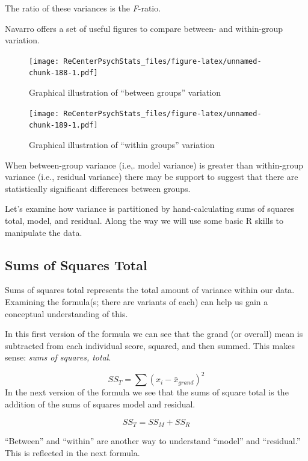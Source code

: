 \documentclass[
  11pt,
]{book}
\begin{document}
The ratio of these variances is the \emph{F}-ratio.

Navarro \citeyearpar{navarro_book_2020} offers a set of useful figures to compare between- and within-group variation.

\begin{figure}
\centering
\texttt{[image: ReCenterPsychStats\_files/figure-latex/unnamed-chunk-188-1.pdf]}
\caption{\label{fig:unnamed-chunk-188}Graphical illustration of ``between groups'' variation}
\end{figure}

\begin{figure}
\centering
\texttt{[image: ReCenterPsychStats\_files/figure-latex/unnamed-chunk-189-1.pdf]}
\caption{\label{fig:unnamed-chunk-189}Graphical illustration of ``within groups'' variation}
\end{figure}

When between-group variance (i.e,. model variance) is greater than within-group variance (i.e., residual variance) there may be support to suggest that there are statistically significant differences between groups.

Let's examine how variance is partitioned by hand-calculating sums of squares total, model, and residual. Along the way we will use some basic R skills to manipulate the data.

\hypertarget{sums-of-squares-total}{%
\subsection{Sums of Squares Total}\label{sums-of-squares-total}}

Sums of squares total represents the total amount of variance within our data. Examining the formula(s; there are variants of each) can help us gain a conceptual understanding of this.

In this first version of the formula we can see that the grand (or overall) mean is subtracted from each individual score, squared, and then summed. This makes sense: \emph{sums of squares, total}.

\[SS_{T}= \sum (x_{i}-\bar{x}_{grand})^{2}\]
In the next version of the formula we see that the sums of square total is the addition of the sums of squares model and residual.

\[SS_{T}= SS_{M} + SS_{R}\]

``Between'' and ``within'' are another way to understand ``model'' and ``residual.'' This is reflected in the next formula.
\end{document}
